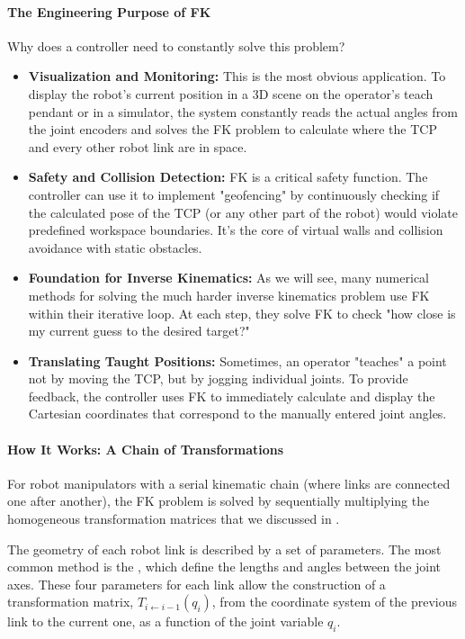 \paragraph{The Engineering Purpose of FK} Why does a controller need to constantly solve this problem?
\begin{itemize}
    \item \textbf{Visualization and Monitoring:} This is the most obvious application. To display the robot's current position in a 3D scene on the operator's teach pendant or in a simulator, the system constantly reads the actual angles from the joint encoders and solves the FK problem to calculate where the TCP and every other robot link are in space.

    \item \textbf{Safety and Collision Detection:} FK is a critical safety function. The controller can use it to implement "geofencing" by continuously checking if the calculated pose of the TCP (or any other part of the robot) would violate predefined workspace boundaries. It's the core of virtual walls and collision avoidance with static obstacles.

    \item \textbf{Foundation for Inverse Kinematics:} As we will see, many numerical methods for solving the much harder inverse kinematics problem use FK within their iterative loop. At each step, they solve FK to check "how close is my current guess to the desired target?"

    \item \textbf{Translating Taught Positions:} Sometimes, an operator "teaches" a point not by moving the TCP, but by jogging individual joints. To provide feedback, the controller uses FK to immediately calculate and display the Cartesian coordinates that correspond to the manually entered joint angles.
\end{itemize}

\paragraph{How It Works: A Chain of Transformations}
For robot manipulators with a serial kinematic chain (where links are connected one after another), the FK problem is solved by sequentially multiplying the homogeneous transformation matrices that we discussed in .

The geometry of each robot link is described by a set of parameters. The most common method is the , which define the lengths and angles between the joint axes. These four parameters for each link allow the construction of a transformation matrix, $T_{i \leftarrow i-1}(q_i)$, from the coordinate system of the previous link to the current one, as a function of the joint variable $q_i$.

